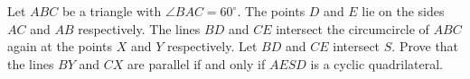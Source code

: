 Let $ABC$ be a triangle with $\angle BAC = 60^\circ$.
The points $D$ and $E$ lie on the sides $AC$ and $AB$ respectively.
The lines $BD$ and $CE$ intersect the circumcircle of $ABC$ again at the
points $X$ and $Y$ respectively. Let $BD$ and $CE$ intersect $S$.
Prove that the lines $BY$ and $CX$ are parallel if and only if $AESD$ is a cyclic quadrilateral.